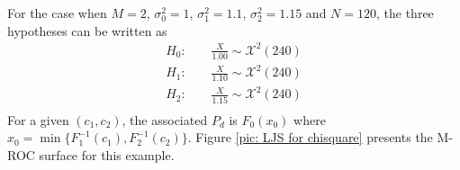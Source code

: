 For the case when $M=2$, $\sigma_0^2 = 1$, $\sigma_1^2 = 1.1$, $\sigma_2^2 = 1.15$ and $N=120$, the three hypotheses can be written as
\begin{equation}
  \label{2015mar29a0}
  \begin{split}
    H_0:\;\;\;\;&\frac{X}{1.00} \sim \mathcal{X}^2(240) \\ 
    H_1:\;\;\;\;&\frac{X}{1.10} \sim \mathcal{X}^2(240) \\ 
    H_2:\;\;\;\;&\frac{X}{1.15} \sim \mathcal{X}^2(240) \\ 
  \end{split}
\end{equation}
For a given $(c_1, c_2)$, the associated $P_d$ is $F_0(x_0)$ where $x_0 = \min \{F_1^{-1}(c_1),  F_2^{-1}(c_2)\}$. 
Figure \ref{pic: LJS for chisquare} presents the M-ROC surface for this example. 

